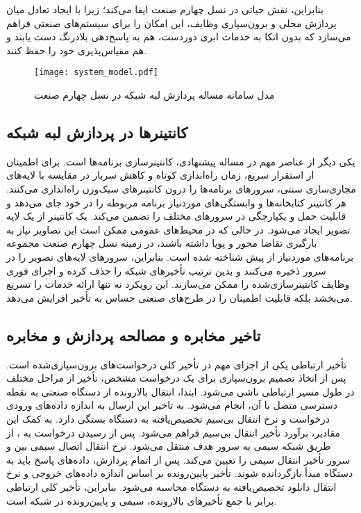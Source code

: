 بنابراین،  نقش حیاتی در نسل چهارم صنعت ایفا می‌کند؛ زیرا با ایجاد تعادل میان پردازش محلی و برون‌سپاری وظایف، این امکان را برای سیستم‌های صنعتی فراهم می‌سازد که بدون اتکا به خدمات ابری دوردست، هم به پاسخ‌دهی بلادرنگ دست یابند و هم مقیاس‌پذیری خود را حفظ کنند.

\vspace{0.5cm}
\begin{figure}[h]
\centering
\texttt{[image: system\_model.pdf]}
\caption{مدل سامانه مساله پردازش لبه شبکه در نسل چهارم صنعت}
\label{figure:system_model}
\end{figure}
\vspace{0.5cm}

\subsection{کانتینرها در پردازش لبه شبکه}

یکی دیگر از عناصر مهم در مساله  پیشنهادی، کانتینرسازی برنامه‌ها است. برای اطمینان از استقرار سریع، زمان راه‌اندازی کوتاه و کاهش سربار در مقایسه با لایه‌های مجازی‌سازی سنتی، سرورهای  برنامه‌ها را درون کانتینرهای سبک‌وزن راه‌اندازی می‌کنند. هر کانتینر کتابخانه‌ها و وابستگی‌های موردنیاز برنامه مربوطه را در خود جای می‌دهد و قابلیت حمل و یکپارچگی در سرورهای مختلف را تضمین می‌کند. یک کانتینر از یک لایه تصویر ایجاد می‌شود. در حالی که در محیط‌های  عمومی ممکن است این تصاویر نیاز به بارگیری تقاضا محور و پویا داشته باشند، در زمینه نسل چهارم صنعت مجموعه برنامه‌های موردنیاز از پیش شناخته شده است. بنابراین، سرورهای  لایه‌های تصویر را در سرور  ذخیره می‌کنند و بدین ترتیب تأخیرهای شبکه را حذف کرده و اجرای فوری وظایف کانتینرسازی‌شده را ممکن می‌سازند. این رویکرد نه تنها ارائه خدمات را تسریع می‌بخشد بلکه قابلیت اطمینان را در طرح‌های صنعتی حساس به تأخیر افزایش می‌دهد.

\subsection{تاخیر مخابره و مصالحه پردازش و مخابره}

تأخیر ارتباطی یکی از اجزای مهم در تأخیر کلی درخواست‌های برون‌سپاری‌شده است. پس از اتخاذ تصمیم برون‌سپاری برای یک درخواست مشخص، تأخیر از مراحل مختلف در طول مسیر ارتباطی ناشی می‌شود. ابتدا، انتقال بالارونده از دستگاه صنعتی به نقطه دسترسی  متصل با آن، انجام می‌شود. به تاخیر این ارسال به اندازه داده‌های ورودی درخواست و نرخ انتقال بی‌سیم تخصیص‌یافته به دستگاه بستگی دارد. به کمک این مقادیر، برآورد تأخیر انتقال بی‌سیم فراهم می‌شود. پس از رسیدن درخواست به ، از طریق شبکه سیمی به سرور  هدف منتقل می‌شود. نرخ انتقال اتصال سیمی بین  و سرور  تأخیر انتقال سیمی را تعیین می‌کند. پس از اتمام پردازش، داده‌های پاسخ باید به دستگاه مبدأ بازگردانده شوند. تأخیر پایین‌رونده بر اساس اندازه داده‌های خروجی و نرخ انتقال دانلود تخصیص‌یافته به دستگاه محاسبه می‌شود. بنابراین، تأخیر کلی ارتباطی برابر با جمع تأخیرهای بالارونده، سیمی و پایین‌رونده در شبکه است.

